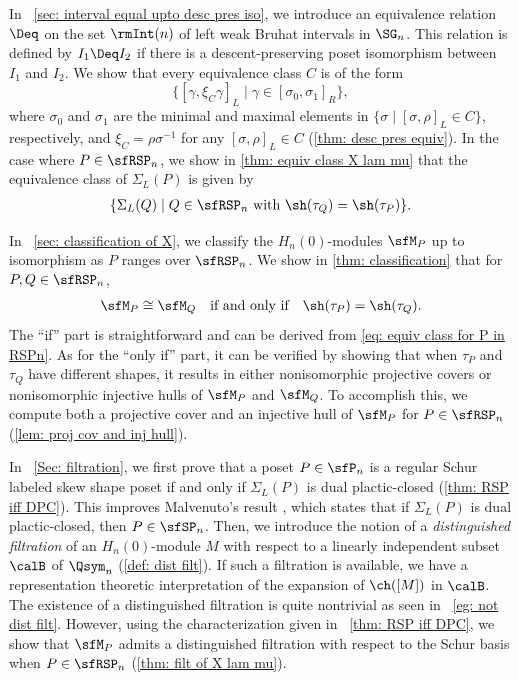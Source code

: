 \documentclass[12pt, reqno]{amsart}
\theoremstyle{definition}
\numberwithin{equation}{section} \numberwithin{figure}{section}
\numberwithin{table}{section}
\begin{document}
In ~\cref{sec: interval equal upto desc pres iso},
we introduce an equivalence relation $\Deq$ on the set $\rmInt(n)$ of left weak Bruhat intervals in $\SG_n$. This relation is defined by
$I_1 \Deq I_2$ if there is a descent-preserving poset isomorphism between $I_1$ and $I_2$.
We show that every  equivalence class $C$ is of the form
\[
\{[\gamma,  \xi_C\gamma]_L \mid \gamma \in [\sigma_0, \sigma_1]_R\},
\]
where $\sigma_0$ and $\sigma_1$ are the minimal and maximal elements in $\{\sigma \mid [\sigma, \rho]_L \in C\}$, 
respectively, and $\xi_C = \rho \sigma^{-1}$ for any $[\sigma, \rho]_L \in C$
(\cref{thm: desc pres equiv}).
In the case where $P \in \sfRSP_n$, 
we show in \cref{thm: equiv class X lam mu} that the equivalence class of $\Sigma_L(P)$ is given by
\begin{align}\label{eq: equiv class for P in RSPn}
\{\Sigma_L(Q) \mid \text{$Q \in \sfRSP_n$ with $\sh(\tau_Q) = \sh(\tau_P)$} \}.
\end{align}


In ~\cref{sec: classification of X}, we classify the $H_n(0)$-modules $\sfM_P$
up to isomorphism as $P$ ranges over $\sfRSP_n$.
We show in \cref{thm: classification} that for $P, Q \in \sfRSP_n$, 
\begin{align*}
\sfM_P \cong \sfM_Q \quad \text{if and only if} \quad \sh(\tau_P) = \sh(\tau_Q).
\end{align*}
The ``if'' part is straightforward and can be derived from \cref{eq: equiv class for P in RSPn}. As for the ``only if'' part, it can be verified by showing that when $\tau_P$ and $\tau_Q$ have different shapes, it results in either nonisomorphic projective covers or nonisomorphic injective hulls of $\sfM_P$ and $\sfM_Q$. 
To accomplish this, we compute both a projective cover and an injective hull of $\sfM_P$ for $P \in \sfRSP_n$ (\cref{lem: proj cov and inj hull}).




In ~\cref{Sec: filtration}, we first prove that a poset $P \in \sfP_n$ is a regular Schur labeled skew shape poset if and only if $\Sigma_L(P)$ is dual plactic-closed (\cref{thm: RSP iff DPC}).
This improves Malvenuto's result \cite[Theorem 1]{93M}, which states that if $\Sigma_L(P)$ is dual plactic-closed, then $P \in \sfSP_n$.
Then, we introduce the notion of a \emph{distinguished filtration} of an $H_n(0)$-module $M$ with respect to a linearly independent subset $\calB$ of $\Qsym_n$ (\cref{def: dist filt}).
If such a filtration is available, we have a  representation theoretic interpretation of the expansion of $\ch([M])$ in $\calB$.
The existence of a distinguished filtration is quite nontrivial as seen in ~\cref{eg: not dist filt}.
However, using the characterization given in ~\cref{thm: RSP iff DPC}, we show that $\sfM_P$  admits a distinguished filtration with respect to the Schur basis 
when $P \in \sfRSP_n$ (\cref{thm: filt of X lam mu}).
\end{document}
